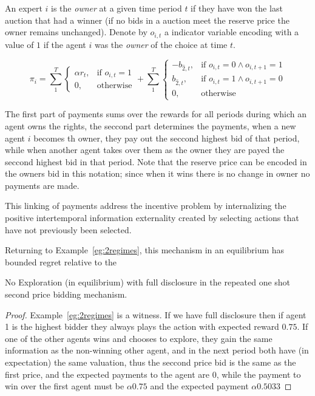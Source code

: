 \begin{mech}

An expert $i$ is the \emph{owner} at a given time period $t$ if they have won the last auction that had a winner (if no bids in a auction meet the reserve price the owner remains unchanged). 
Denote by $o_{i,t}$ a indicator variable encoding with a value of $1$ if the agent $i$ was the \emph{owner} of the choice at time $t$. 

\[
    \pi_i =  \sum_1^T
\begin{cases}
    \alpha r_t ,& \text{if } o_{i,t} = 1\\
    0,              & \text{otherwise}
\end{cases}
+
\sum_1^T
\begin{cases}
     - b_{\hat{2},t} ,& \text{if } o_{i,t} = 0 \land o_{i,t+1} = 1\\
      b_{\hat{2},t} ,& \text{if } o_{i,t}= 1 \land o_{i,t+1} = 0 \\
		0,              & \text{otherwise}
\end{cases}
\]

\end{mech}


The first part of payments sums over the rewards for all periods during which an agent owns the rights, the seccond part determines the payments, when a new agent $i$ becomes th owner, they pay out the seccond highest bid of that period, while when another agent takes over them as the owner they are payed the seccond highest bid in that period. Note that the reserve price can be encoded in the owners bid in this notation; since when it wins there is no change in owner no payments are made. 

This linking of payments address the incentive problem by internalizing the positive intertemporal information externality created by selecting actions that have not previously been selected.


Returning to Example~\ref{eg:2regimes}, this mechanism in an equilibrium has bounded regret relative to the 

\begin{lem}
No Exploration (in equilibrium) with full disclosure in the repeated one shot second price bidding mechanism.
\end{lem}

\begin{proof}
Example~\ref{eg:2regimes} is a witness. If we have full disclosure then if agent 1 is the highest bidder they always plays the action with expected reward $0.75$. If one of the other agents wins and chooses to explore, they gain the same information as the non-winning other agent, and in the next period both have (in expectation) the same valuation, thus the seccond price bid is the same as the first price, and the expected payments to the agent are 0, while the payment to win over the first agent must be $\alpha 0.75$ and the expected payment $\alpha 0.5033$
\end{proof}

